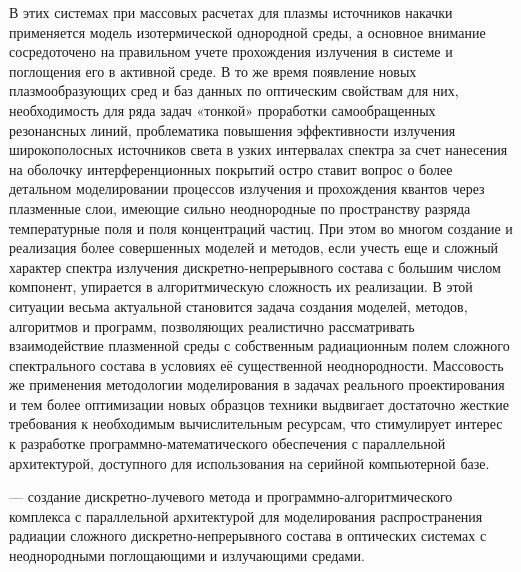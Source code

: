 В этих системах при массовых расчетах для плазмы источников накачки применяется модель изотермической однородной среды, а основное внимание сосредоточено на правильном учете прохождения излучения в системе и поглощения его в активной среде.
В то же время появление новых плазмообразующих сред и баз данных по оптическим свойствам для них, необходимость для ряда задач «тонкой» проработки самообращенных резонансных линий, проблематика повышения эффективности излучения широкополосных источников света в узких интервалах спектра за счет нанесения на оболочку интерференционных покрытий остро ставит вопрос о более детальном моделировании процессов излучения и прохождения квантов через плазменные слои, имеющие сильно неоднородные по пространству разряда температурные поля и поля концентраций частиц.
При этом во многом создание и реализация более совершенных моделей и методов, если учесть еще и сложный характер спектра излучения дискретно-непрерывного состава с большим числом компонент,  упирается в алгоритмическую сложность их реализации.
В этой ситуации весьма актуальной становится задача создания моделей, методов, алгоритмов и программ, позволяющих реалистично рассматривать взаимодействие плазменной среды с собственным радиационным полем сложного спектрального состава  в условиях её существенной неоднородности.
Массовость же применения методологии моделирования в задачах реального проектирования и тем более  оптимизации новых образцов техники выдвигает достаточно жесткие требования к необходимым  вычислительным ресурсам, что стимулирует интерес к разработке программно-математического обеспечения с параллельной архитектурой, доступного для использования на серийной компьютерной базе.

 — создание дискретно-лучевого метода и программно-алгоритмического комплекса с параллельной архитектурой для моделирования распространения радиации сложного дискретно-непрерывного состава в оптических системах с неоднородными поглощающими и излучающими средами.

